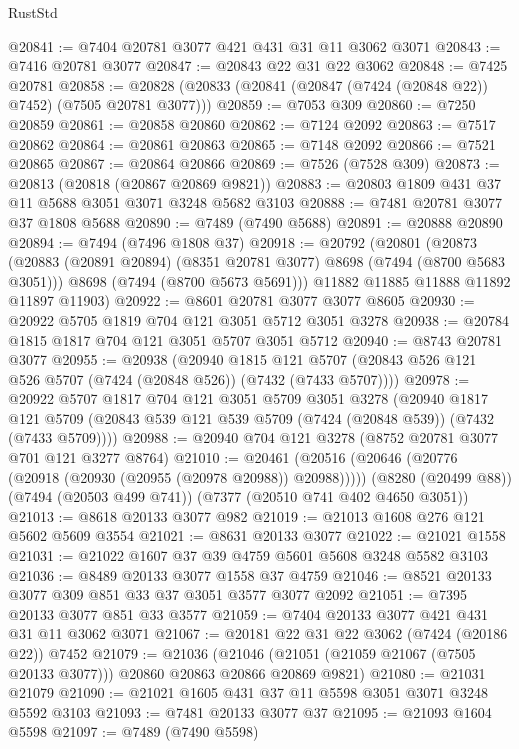 \begin{lexlean}{RustStd}
\begin{coremodule}
@20841 := @7404 @20781 @3077 @421 @431 @31 @11 @3062 @3071
@20843 := @7416 @20781 @3077
@20847 := @20843 @22 @31 @22 @3062
@20848 := @7425 @20781
@20858 := @20828 (@20833 (@20841 (@20847 (@7424 (@20848 @22)) @7452) (@7505 @20781 @3077)))
@20859 := @7053 @309
@20860 := @7250 @20859
@20861 := @20858 @20860
@20862 := @7124 @2092
@20863 := @7517 @20862
@20864 := @20861 @20863
@20865 := @7148 @2092
@20866 := @7521 @20865
@20867 := @20864 @20866
@20869 := @7526 (@7528 @309)
@20873 := @20813 (@20818 (@20867 @20869 @9821))
@20883 := @20803 @1809 @431 @37 @11 @5688 @3051 @3071 @3248 @5682 @3103
@20888 := @7481 @20781 @3077 @37 @1808 @5688
@20890 := @7489 (@7490 @5688)
@20891 := @20888 @20890
@20894 := @7494 (@7496 @1808 @37)
@20918 := @20792
    (@20801
      (@20873
        (@20883 (@20891 @20894) (@8351 @20781 @3077) @8698 (@7494 (@8700 @5683 @3051)))
        @8698
        (@7494 (@8700 @5673 @5691)))
      @11882
      @11885
      @11888
      @11892
      @11897
      @11903)
@20922 := @8601 @20781 @3077 @3077 @8605
@20930 := @20922 @5705 @1819 @704 @121 @3051 @5712 @3051 @3278
@20938 := @20784 @1815 @1817 @704 @121 @3051 @5707 @3051 @5712
@20940 := @8743 @20781 @3077
@20955 := @20938
    (@20940
      @1815
      @121
      @5707
      (@20843 @526 @121 @526 @5707 (@7424 (@20848 @526)) (@7432 (@7433 @5707))))
@20978 := @20922
    @5707
    @1817
    @704
    @121
    @3051
    @5709
    @3051
    @3278
    (@20940
      @1817
      @121
      @5709
      (@20843 @539 @121 @539 @5709 (@7424 (@20848 @539)) (@7432 (@7433 @5709))))
@20988 := @20940 @704 @121 @3278 (@8752 @20781 @3077 @701 @121 @3277 @8764)
@21010 := @20461
    (@20516 (@20646 (@20776 (@20918 (@20930 (@20955 (@20978 @20988)) @20988)))))
    (@8280 (@20499 @88))
    (@7494 (@20503 @499 @741))
    (@7377 (@20510 @741 @402 @4650 @3051))
@21013 := @8618 @20133 @3077 @982
@21019 := @21013 @1608 @276 @121 @5602 @5609 @3554
@21021 := @8631 @20133 @3077
@21022 := @21021 @1558
@21031 := @21022 @1607 @37 @39 @4759 @5601 @5608 @3248 @5582 @3103
@21036 := @8489 @20133 @3077 @1558 @37 @4759
@21046 := @8521 @20133 @3077 @309 @851 @33 @37 @3051 @3577 @3077 @2092
@21051 := @7395 @20133 @3077 @851 @33 @3577
@21059 := @7404 @20133 @3077 @421 @431 @31 @11 @3062 @3071
@21067 := @20181 @22 @31 @22 @3062 (@7424 (@20186 @22)) @7452
@21079 := @21036
    (@21046 (@21051 (@21059 @21067 (@7505 @20133 @3077))) @20860 @20863 @20866 @20869 @9821)
@21080 := @21031 @21079
@21090 := @21021 @1605 @431 @37 @11 @5598 @3051 @3071 @3248 @5592 @3103
@21093 := @7481 @20133 @3077 @37
@21095 := @21093 @1604 @5598
@21097 := @7489 (@7490 @5598)

\end{coremodule}
\end{lexlean}
